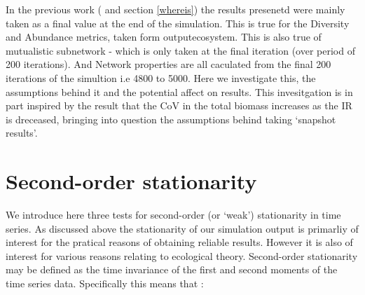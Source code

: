 In the previous work (\cite{lurgi2015effects} and section \ref{whereis}) the results presenetd were mainly taken as a final value at the end of the simulation. This is true for the Diversity and Abundance metrics, taken form outputecosystem. This is also true of mutualistic subnetwork - which is only taken at the final iteration (over period of 200 iterations). And Network properties are all caculated from the final 200 iterations of the simultion i.e 4800 to 5000. Here we investigate this, the assumptions behind it and the potential affect on results. This invesitgation is in part inspired by the result that the CoV in the total biomass increases as the IR is dreceased, bringing into question the assumptions behind taking `snapshot results'.



\section{Second-order stationarity}


We introduce here three tests for second-order (or `weak') stationarity in time series. As discussed above the stationarity of our simulation output is primarliy of interest for the pratical reasons of obtaining reliable results. However it is also of interest for various reasons relating to ecological theory. Second-order stationarity may be defined as the time invariance of the first and second moments of the time series data. Specifically this means that \cite{BOOKONDESK}:


